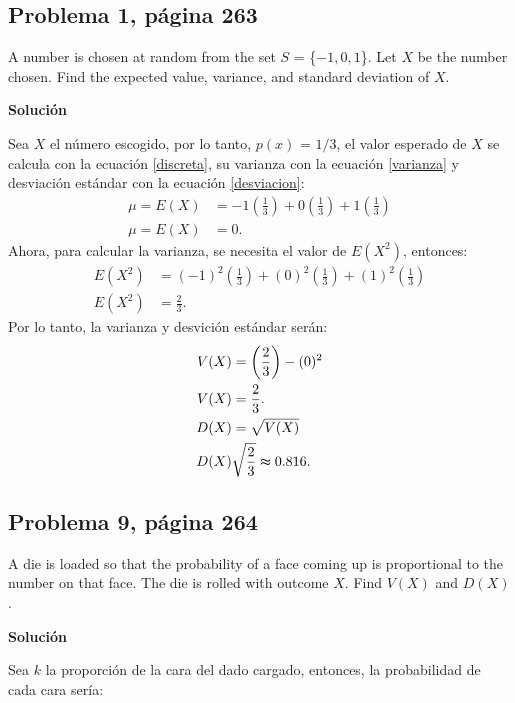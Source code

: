 \documentclass{article}
\begin{document}
\subsection{Problema 1, página 263}
A number is chosen at random from the set $S$ = \{$-1, 0, 1$\}. Let $X$ be the number chosen. Find the expected value, variance, and standard deviation of $X$.

\noindent \textbf{Solución}

\noindent Sea $X$ el número escogido, por lo tanto, $p(x)$ = $1/3$, el valor esperado de $X$ se calcula con la ecuación \ref{discreta}, su varianza con la ecuación \ref{varianza} y desviación estándar con la ecuación \ref{desviacion}:
\begin{align}
\nonumber
\mu = E{(X)}    & = -1\left(\frac{1}{3}\right) + 0\left(\frac{1}{3}\right) + 1\left(\frac{1}{3}\right)  \\  \nonumber
\mu = E{(X)}    & = 0.
\end{align}
Ahora, para calcular la varianza, se necesita el valor de $E(X^2)$, entonces:
\begin{align}
\nonumber
E{(X^2)}    & = (-1)^2\left(\frac{1}{3}\right) + (0)^2\left(\frac{1}{3}\right) + (1)^2\left(\frac{1}{3}\right)  \\ \nonumber
E{(X^2)}    & = \frac{2}{3}.
\end{align}
Por lo tanto, la varianza y desvición estándar serán:
\begin{align}
V{(X)} & = \left(\frac{2}{3}\right) - (0)^2 \\ \nonumber
V{(X)} & = \frac{2}{3}. \\ \nonumber
D{(X)} & = \sqrt{V(X)} \\ \nonumber
D{(X)} & \sqrt{\frac{2}{3}} \thickapprox 0.816. 
\end{align}

\subsection{Problema 9, página 264}
A die is loaded so that the probability of a face coming up is proportional to the number on that face. The die is rolled with outcome $X$. Find $V(X)$ and $D(X)$.

\noindent \textbf{Solución}

\noindent Sea $k$ la proporción de la cara del dado cargado, entonces, la probabilidad de cada cara sería: 
\end{document}
